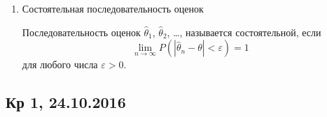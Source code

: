 \documentclass[12pt, a4paper]{article}\usepackage[]{graphicx}\usepackage[]{color}
\begin{document}
\begin{enumerate}
\begin{enumerate}
\item Состоятельная последовательность оценок

Последовательность оценок $\hat \theta_1$, $\hat \theta_2$, \ldots, называется состоятельной, если
\[
\lim_{n\to\infty} P(|\hat \theta_n - \theta| < \varepsilon) = 1
\]
для любого числа $\varepsilon >0$.


\end{enumerate}



\end{enumerate}





\subsection{Кр 1, 24.10.2016}



\end{document}
